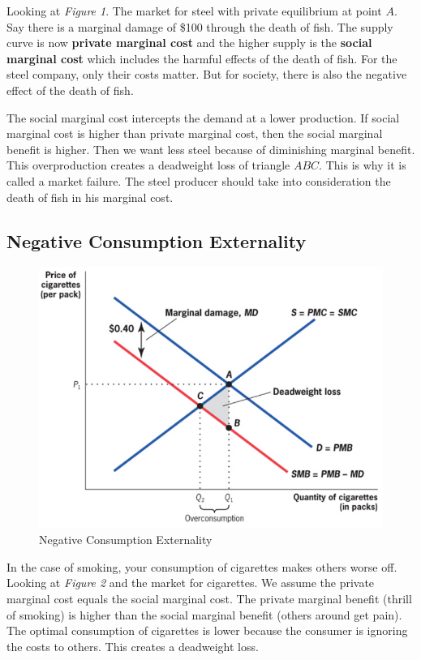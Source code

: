 \documentclass{article}
\begin{document}
Looking at \textit{Figure 1}. The market for steel with private equilibrium at
point $A$. Say there is a marginal damage of \$100 through the death of fish.
The supply curve is now \textbf{private marginal cost} and the higher supply is
the \textbf{social marginal cost} which includes the harmful effects of the
death of fish. For the steel company, only their costs matter. But for society,
there is also the negative effect of the death of fish. 

The social marginal cost intercepts the demand at a lower production. If social
marginal cost is higher than private marginal cost, then the social marginal
benefit is higher. Then we want less steel because of diminishing marginal
benefit. This overproduction creates a deadweight loss of triangle $ABC$. This
is why it is called a market failure. The steel producer should take into
consideration the death of fish in his marginal cost.

\subsection{ Negative Consumption Externality }

\begin{figure}[H]
    \centering
    \includegraphics[scale=0.63]{"Negative Consumption Externality"}
    \caption{Negative Consumption Externality}
\end{figure}

In the case of smoking, your consumption of cigarettes makes others worse off.
Looking at \textit{Figure 2} and the market for cigarettes. We assume the
private marginal cost equals the social marginal cost. The private marginal
benefit (thrill of smoking) is higher than the social marginal benefit (others
around get pain). The optimal consumption of cigarettes is lower because the
consumer is ignoring the costs to others. This creates a deadweight loss.
\end{document}
